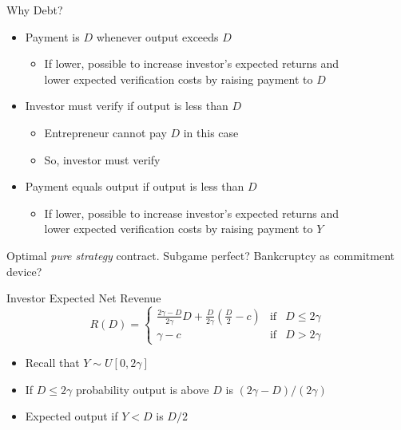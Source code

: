 \documentclass[11pt,aspectratio=169,xcolor={dvipsnames},hyperref={pdftex,pdfpagemode=UseNone,hidelinks,pdfdisplaydoctitle=true},usepdftitle=false]{beamer}
\begin{document}
\begin{frame}{Why Debt?}
\vspace{10pt}
\begin{itemize} \addtocounter{enumi}{3}
	\itemsep1em 
	\item Payment is $D$ whenever output exceeds $D$
	\begin{itemize}
		\item If lower, possible to increase investor's expected returns and \\ lower expected verification costs by raising payment to $D$
	\end{itemize}
	\item Investor must verify if output is less than $D$
	\begin{itemize}
		\item Entrepreneur cannot pay $D$ in this case
		\item So, investor must verify
	\end{itemize}
	\item Payment equals output if output is less than $D$
	\begin{itemize}
		\item If lower, possible to increase investor's expected returns and \\ lower expected verification costs by raising payment to $Y$
	\end{itemize}
\end{itemize}
\vspace{10pt}
{\footnotesize Optimal \textit{pure strategy} contract. Subgame perfect? Bankcruptcy as commitment device?}
\end{frame}


\begin{frame}{Investor Expected Net Revenue}
\[ R(D) = \left\{ \begin{array}{lll} 
\frac{2\gamma - D}{2\gamma} D + \frac{D}{2\gamma} \left( \frac{D}{2} - c \right) & \text{if} & D \leq 2\gamma \\
\gamma - c & \text{if} & D > 2\gamma
\end{array} \right. \] 
\begin{itemize}
	\item Recall that $Y \sim U[0,2\gamma]$
	\item If $D\leq 2\gamma$ probability output is above $D$ is $(2\gamma-D)/(2\gamma)$
	\item Expected output if $Y<D$ is $D/2$ 
\end{itemize}
\end{frame}
\end{document}
